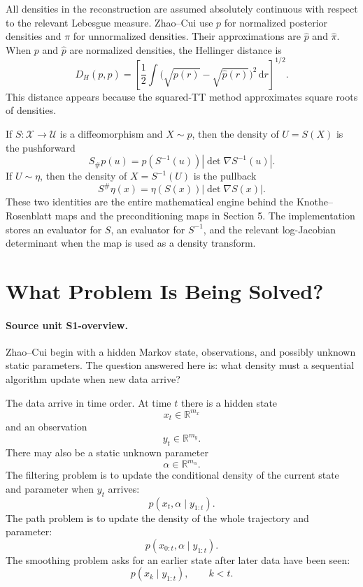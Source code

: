 \documentclass[11pt]{article}
\newcommand{\R}{\mathbb R}
\newcommand{\dd}{\,\mathrm d}
\begin{document}
All densities in the reconstruction are assumed absolutely continuous with
respect to the relevant Lebesgue measure.  Zhao--Cui use \(p\) for normalized
posterior densities and \(\pi\) for unnormalized densities.  Their
approximations are \(\widehat p\) and \(\widehat\pi\).  When \(p\) and
\(\widehat p\) are normalized densities, the Hellinger distance is
\[
    D_H(p,\widehat p)
    =
    \left[
    \frac12
    \int
    \bigl(\sqrt{p(r)}-\sqrt{\widehat p(r)}\bigr)^2\dd r
    \right]^{1/2}.
    \tag{N3}
\]
This distance appears because the squared-TT method approximates square roots
of densities.

If \(S:\mathcal X\to\mathcal U\) is a diffeomorphism and \(X\sim p\), then
the density of \(U=S(X)\) is the pushforward
\[
    S_\#p(u)
    =
    p(S^{-1}(u))\left|\det\nabla S^{-1}(u)\right|.
    \tag{N4}
\]
If \(U\sim\eta\), then the density of \(X=S^{-1}(U)\) is the pullback
\[
    S^\#\eta(x)
    =
    \eta(S(x))\left|\det\nabla S(x)\right|.
    \tag{N5}
\]
These two identities are the entire mathematical engine behind the
Knothe--Rosenblatt maps and the preconditioning maps in Section 5.  The
implementation stores an evaluator for \(S\), an evaluator for \(S^{-1}\), and
the relevant log-Jacobian determinant when the map is used as a density
transform.

\section{What Problem Is Being Solved?}

\paragraph{Source unit S1-overview.}
Zhao--Cui begin with a hidden Markov state, observations, and possibly unknown
static parameters.  The question answered here is: what density must a
sequential algorithm update when new data arrive?

The data arrive in time order.  At time \(t\) there is a hidden state
\[
    x_t\in \R^{m_x}
\]
and an observation
\[
    y_t\in \R^{m_y}.
\]
There may also be a static unknown parameter
\[
    \alpha\in \R^{m_\alpha}.
\]
The filtering problem is to update the conditional density of the current state
and parameter when \(y_t\) arrives:
\[
    p(x_t,\alpha\mid y_{1:t}).
\]
The path problem is to update the density of the whole trajectory and parameter:
\[
    p(x_{0:t},\alpha\mid y_{1:t}).
\]
The smoothing problem asks for an earlier state after later data have been seen:
\[
    p(x_k\mid y_{1:t}),\qquad k<t.
\]
\end{document}
